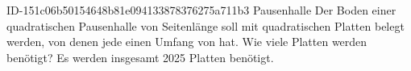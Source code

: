 \begin{exercise}
      {ID-151c06b50154648b81e094133878376275a711b3}
      {Pausenhalle}
  \ifproblem\problem
    Der Boden einer quadratischen Pausenhalle von  Seitenlänge soll
    mit quadratischen Platten belegt werden, von denen jede einen Umfang von
     hat. Wie viele Platten werden benötigt?
  \fi
  \ifoutcome\outcome
    Es werden insgesamt \num{2025} Platten benötigt.
  \fi
\end{exercise}
